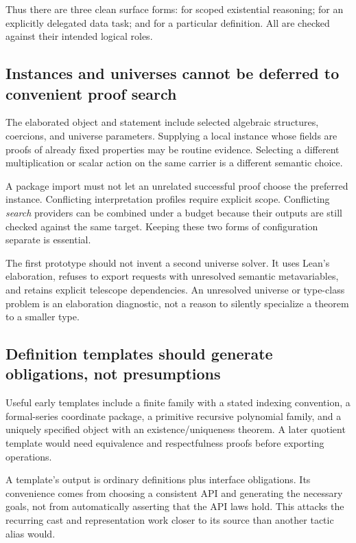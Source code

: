 \documentclass[11pt,a4paper]{article}
\newcommand{\code}[1]{\texttt{\detokenize{#1}}}
\theoremstyle{definition}
\theoremstyle{remark}
\begin{document}
Thus there are three clean surface forms: \code{obtain} for scoped existential reasoning; \code{construct ... satisfying} for an explicitly delegated data task; and \code{define ... :=} for a particular definition. All are checked against their intended logical roles.

\subsection{Instances and universes cannot be deferred to convenient proof search}
The elaborated object and statement include selected algebraic structures, coercions, and universe parameters. Supplying a local instance whose fields are proofs of already fixed properties may be routine evidence. Selecting a different multiplication or scalar action on the same carrier is a different semantic choice.

A package import must not let an unrelated successful proof choose the preferred instance. Conflicting interpretation profiles require explicit scope. Conflicting \emph{search} providers can be combined under a budget because their outputs are still checked against the same target. Keeping these two forms of configuration separate is essential.

The first prototype should not invent a second universe solver. It uses Lean's elaboration, refuses to export requests with unresolved semantic metavariables, and retains explicit telescope dependencies. An unresolved universe or type-class problem is an elaboration diagnostic, not a reason to silently specialize a theorem to a smaller type.

\subsection{Definition templates should generate obligations, not presumptions}
Useful early templates include a finite family with a stated indexing convention, a formal-series coordinate package, a primitive recursive polynomial family, and a uniquely specified object with an existence/uniqueness theorem. A later quotient template would need equivalence and respectfulness proofs before exporting operations.

A template's output is ordinary definitions plus interface obligations. Its convenience comes from choosing a consistent API and generating the necessary goals, not from automatically asserting that the API laws hold. This attacks the recurring cast and representation work closer to its source than another tactic alias would.
\end{document}
